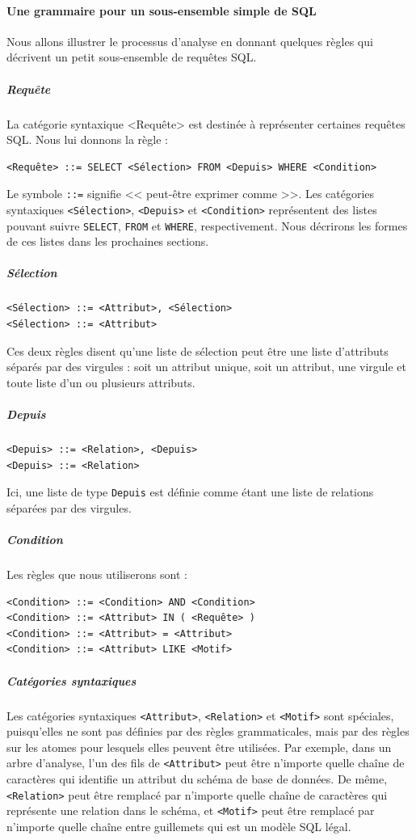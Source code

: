 \paragraph{Une grammaire pour un sous-ensemble simple de SQL}
Nous allons illustrer le processus d'analyse en donnant quelques règles qui décrivent un petit sous-ensemble de requêtes SQL.

\subparagraph{Requête}
La catégorie syntaxique <Requête> est destinée à représenter certaines requêtes SQL. Nous lui donnons la règle :
\begin{verbatim}
<Requête> ::= SELECT <Sélection> FROM <Depuis> WHERE <Condition>
\end{verbatim}

Le symbole \texttt{::=} signifie << peut-être exprimer comme >>. Les catégories syntaxiques \texttt{<Sélection>}, \texttt{<Depuis>} et \texttt{<Condition>} représentent des listes pouvant suivre \texttt{SELECT}, \texttt{FROM} et \texttt{WHERE}, respectivement. Nous décrirons les formes de ces listes dans les prochaines sections.

\subparagraph{Sélection}
\begin{verbatim}
<Sélection> ::= <Attribut>, <Sélection>
<Sélection> ::= <Attribut>
\end{verbatim} 
Ces deux règles disent qu'une liste de sélection peut être une liste d'attributs séparés par des virgules : soit un attribut unique, soit un attribut, une virgule et toute liste d'un ou plusieurs attributs.

\subparagraph{Depuis}
\begin{verbatim}
<Depuis> ::= <Relation>, <Depuis>
<Depuis> ::= <Relation>
\end{verbatim}
Ici, une liste de type \texttt{Depuis} est définie comme étant une liste de relations séparées par des virgules.

\subparagraph{Condition}
Les règles que nous utiliserons sont :
\begin{verbatim}
<Condition> ::= <Condition> AND <Condition>
<Condition> ::= <Attribut> IN ( <Requête> )
<Condition> ::= <Attribut> = <Attribut>
<Condition> ::= <Attribut> LIKE <Motif>
\end{verbatim}

\subparagraph{Catégories syntaxiques}
Les catégories syntaxiques \texttt{<Attribut>}, \texttt{<Relation>} et \texttt{<Motif>} sont spéciales, puisqu'elles ne sont pas définies par des règles grammaticales, mais par des règles sur les atomes pour lesquels elles peuvent être utilisées. Par exemple, dans un arbre d'analyse, l'un des fils de \texttt{<Attribut>} peut être n'importe quelle chaîne de caractères qui identifie un attribut du schéma de base de données. De même, \texttt{<Relation>} peut être remplacé par n'importe quelle chaîne de caractères qui représente une relation dans le schéma, et \texttt{<Motif>} peut être remplacé par n'importe quelle chaîne entre guillemets qui est un modèle SQL légal.

